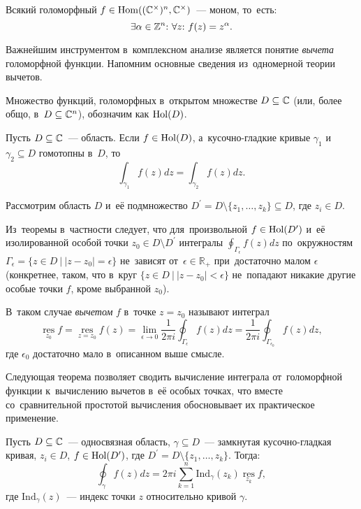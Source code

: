 \documentclass[a4paper,oneside]{article}
\begin{document}
\begin{theorem*}
    Всякий голоморфный $f \in \mathrm{Hom}((\mathbb{C}^\times)^n, \mathbb{C}^\times)$~— моном, то~есть:
    $$
        \exists \alpha \in \mathbb{Z}^n{:}\ \forall z{:}\ f(z) = z^\alpha.
    $$
\end{theorem*}


Важнейшим инструментом в~комплексном анализе является понятие \textit{вычета} голоморфной функции.
Напомним основные сведения из~одномерной теории вычетов.

Множество функций, голоморфных в~открытом множестве $D \subseteq \mathbb{C}$ (или, более общо, в~$D \subseteq \mathbb{C}^n$), обозначим как $\mathrm{Hol}(D)$.

\begin{theorem*}
  Пусть $D \subseteq \mathbb{C}$~— область. Если $f \in \mathrm{Hol}(D)$, а~кусочно-гладкие кривые $\gamma_1$
  и~$\gamma_2 \subseteq D$ гомотопны в~$D$, то
  $$
    \int_{\gamma_1} f(z)dz = \int_{\gamma_2} f(z)dz.
  $$
\end{theorem*}

Рассмотрим область $D$ и~её подмножество $D^\prime = D \setminus \{ z_1, \ldots, z_k \} \subseteq D$, где $z_i \in D$.

Из~теоремы в~частности следует, что для~произвольной $f \in \mathrm{Hol}(D^\prime)$ и~её изолированной
особой точки $z_0 \in D \setminus D^\prime$ интегралы $\oint_{\Gamma_\epsilon} f(z)dz$ по~окружностям
$\Gamma_\epsilon = \{ z \in D \ | \ |z - z_0| = \epsilon \}$ не~зависят от~$\epsilon \in \mathbb{R}_{+}$
при~достаточно малом $\epsilon$ (конкретнее, таком, что в~круг $\{ z \in D \ | \ |z - z_0| < \epsilon \}$
не~попадают никакие другие особые точки $f$, кроме выбранной $z_0$).

В~таком случае \textit{вычетом} $f$ в~точке $z = z_0$ называют интеграл
$$
  \operatorname*{res}\limits_{z_0} f = \operatorname*{res}\limits_{z = z_0} f(z) = \lim\limits_{\epsilon \to 0} \frac{1}{2 \pi i} \oint_{\Gamma_\epsilon} f(z)dz = \frac{1}{2 \pi i} \oint_{\Gamma_{\epsilon_0}} f(z)dz,
$$
где $\epsilon_0$ достаточно мало в~описанном выше смысле.

Следующая теорема позволяет сводить вычисление интеграла от~голоморфной функции к~вычислению вычетов в~её особых точках,
что вместе со~сравнительной простотой вычисления обосновывает их практическое применение.
\begin{theorem*}
  Пусть $D \subseteq \mathbb{C}$~— односвязная область, $\gamma \subseteq D$~— замкнутая кусочно-гладкая кривая,
  $z_i \in D$, $f \in \mathrm{Hol}(D^\prime)$, где $D^\prime = D \setminus \{ z_1, \ldots, z_k \}$.
  Тогда:
  $$
    \oint_{\gamma} f(z)dz = 2 \pi i \sum_{k = 1}^{n} \mathrm{Ind}_{\gamma}(z_k) \operatorname*{res}\limits_{z_k} f,
  $$
  где $\mathrm{Ind}_{\gamma}(z)$~— индекс точки $z$ относительно кривой $\gamma$.
\end{theorem*}
\end{document}
